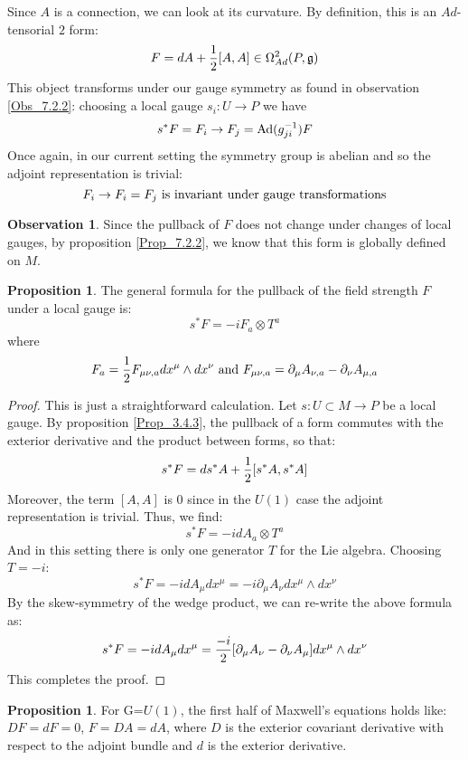 \documentclass[12pt,a4paper]{report}
\theoremstyle{definition}
\theoremstyle{Theorem}
\newtheorem{Prop}[Def]{Proposition}
\theoremstyle{definition}
\theoremstyle{definition}
\newtheorem{Obs}[Def]{Observation}
\begin{document}
	\begin{comment}
		\begin{Obs}
			Since the Lie algebra is of dimension 1 there is a clear isomorphism: let $T$ be a generator for $\mathbb{R}$, then
			$$A_1\otimes T\longrightarrow A_1$$
			is a $1$-form on the manifold.
		\end{Obs}
	\end{comment}
	Since $A$ is a connection, we can look at its curvature. By definition, this is an $Ad$-tensorial $2$ form:
	$$F=dA+{1\over 2}[A,A]\in \Omega^2_{Ad}(P,\mathfrak{g})$$
	This object transforms under our gauge symmetry as found in observation \ref{Obs_7.2.2}: choosing a local gauge $s_i:U\rightarrow P$ we have
	$$s^*F=F_i\rightarrow F_j= \hbox{Ad}(g_{ji}^{-1})F$$
	Once again, in our current setting the symmetry group is abelian and so the adjoint representation is trivial:
	$$F_i\rightarrow F_i=F_j\hbox{ is invariant under gauge transformations}$$
	\begin{Obs}
		Since the pullback of $F$ does not change under changes of local gauges, by proposition \ref{Prop_7.2.2}, we know that this form is globally defined on $M$.
	\end{Obs}
	\begin{Prop}
		The general formula for the pullback of the field strength $F$ under a local gauge is:
		$$s^*F=-iF_a\otimes T^a$$
		where
		$$F_a={1\over 2}F_{\mu\nu,a}dx^\mu\wedge dx^\nu\hbox{ and } F_{\mu\nu,a}=\partial_\mu A_{\nu,a}-\partial_\nu A_{\mu,a}$$
	\end{Prop}
	\begin{proof}
		This is just a straightforward calculation. Let $s:U\subset M\rightarrow P$ be a local gauge. By proposition \ref{Prop_3.4.3}, the pullback of a form commutes with the exterior derivative and the product between forms, so that:
		$$s^*F=ds^*A+{1\over 2}[s^*A,s^*A]$$
		Moreover, the term $[A,A]$ is 0 since in the $U(1)$ case the adjoint representation is trivial. Thus, we find:
		$$s^*F=-idA_a\otimes T^a$$
		And in this setting there is only one generator $T$ for the Lie algebra. Choosing $T=-i$:
		$$s^*F=-idA_\mu dx^\mu=-i\partial_\mu A_\nu dx^\mu\wedge dx^\nu$$
		By the skew-symmetry of the wedge product, we can re-write the above formula as:
		$$s^*F=-idA_\mu dx^\mu={-i\over 2}[\partial_\mu A_\nu-\partial_\nu A_\mu] dx^\mu\wedge dx^\nu$$
		This completes the proof.
	\end{proof}
	\begin{Prop}\label{Prop_8.4.3}
		For G=$U(1)$, the first half of Maxwell's equations holds like: $DF=dF=0$, $F=DA=dA$, where $D$ is the exterior covariant derivative with respect to the adjoint bundle and $d$ is the exterior derivative.
	\end{Prop}
\end{document}
